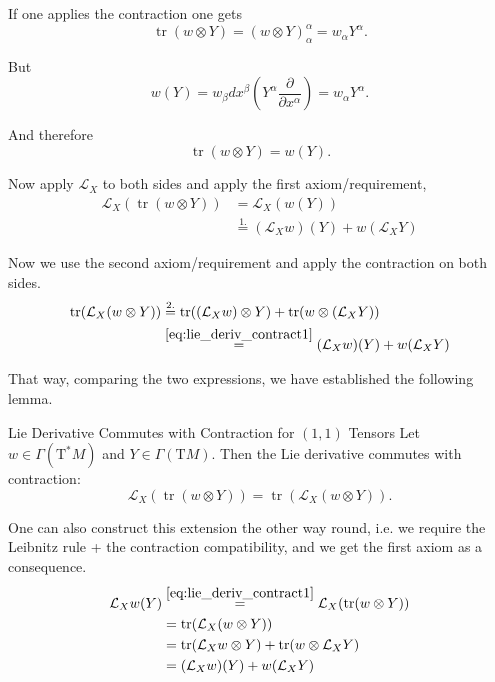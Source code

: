 If one applies the contraction one gets
$$
\operatorname{tr}(w \otimes Y) = (w \otimes Y)^\alpha_\alpha = w_\alpha Y^\alpha.
$$

But
$$w(Y) = w_\beta dx^\beta \left(Y^\alpha \frac{\partial}{\partial x^\alpha}\right)=w_\alpha Y^\alpha.$$

And therefore
\begin{equation}
    \label{eq:lie_deriv_contract1}
    \operatorname{tr}(w \otimes Y) =w(Y).
\end{equation}

Now apply $\mathcal{L}_X$ to both sides and apply the first axiom/requirement,
\begin{align*}
    \mathcal{L}_X(\operatorname{tr}(w \otimes Y))
    &= \mathcal{L}_X(w(Y))\\
    &\stackrel{1.}{=} (\mathcal{L}_X w)(Y) + w(\mathcal{L}_X Y)
\end{align*}

Now we use the second axiom/requirement and apply the contraction on both sides.
\begin{align*}
\operatorname{tr}(\mathcal{L}_X(w \otimes Y))
&\stackrel{2.}{=} \operatorname{tr}((\mathcal{L}_X w) \otimes Y) + \operatorname{tr}(w \otimes (\mathcal{L}_X Y)) \\
&\stackrel{\eqref{eq:lie_deriv_contract1}}{=} (\mathcal{L}_X w)(Y) + w(\mathcal{L}_X Y)
\end{align*}

That way, comparing the two expressions, we have established the following lemma.

\begin{colorlem}{Lie Derivative Commutes with Contraction for $(1,1)$ Tensors}{}
Let $w \in \Gamma(\mathrm{T}^*M)$ and $Y \in \Gamma(\mathrm{T}M)$. Then the Lie derivative commutes with contraction:
\[
\mathcal{L}_X(\operatorname{tr}(w \otimes Y)) = \operatorname{tr}(\mathcal{L}_X(w \otimes Y)).
\]
\end{colorlem}


One can also construct this extension the other way round, i.e. we require the Leibnitz rule + the contraction compatibility, and we get the first axiom as a consequence.
\begin{align*}
\mathcal{L}_X w(Y) 
&\stackrel{\eqref{eq:lie_deriv_contract1}}{=} \mathcal{L}_X(\operatorname{tr}(w \otimes Y)) \\
&= \operatorname{tr}(\mathcal{L}_X(w \otimes Y)) \\
&= \operatorname{tr}(\mathcal{L}_X w \otimes Y) + \operatorname{tr}(w \otimes \mathcal{L}_X Y)\\
&= (\mathcal{L}_X w)(Y) + w(\mathcal{L}_X Y)
\end{align*}



